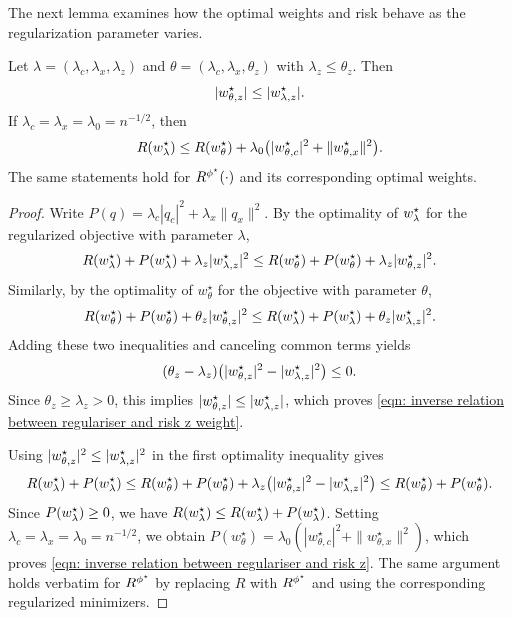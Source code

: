 The next lemma examines how the optimal weights and risk behave as the regularization parameter varies.

\begin{lem}\label{lem: inverse relation between regulariser and risk}
Let $\lambda=(\lambda_c,\lambda_x,\lambda_z)$ and
$\theta=(\lambda_c,\lambda_x,\theta_z)$ with
$\lambda_z\leq\theta_z$. Then
\begin{equation}\label{eqn: inverse relation between regulariser and risk z weight}
|w^\star_{\theta,z}|\leq|w^\star_{{\lambda,z}}|.
\end{equation}
If $\lambda_c=\lambda_x=\lambda_0=n^{-1/2}$, then
\begin{equation}\label{eqn: inverse relation between regulariser and risk z}
R(w^\star_{\lambda})\leq R(w^\star_\theta)
+\lambda_0\bigl(|w^\star_{\theta,c}|^2+\|w^\star_{\theta,x}\|^2\bigr).
\end{equation}
The same statements hold for $R^{\phi^\star}(\cdot)$ and its corresponding optimal weights.
\end{lem}

\begin{proof}
Write $P(q)=\lambda_c|q_c|^2+\lambda_x\|q_x\|^2$. By the optimality of $w^\star_{\lambda}$ for the regularized objective with parameter $\lambda$,
\[
R(w^\star_{\lambda})+P(w^\star_{\lambda})+\lambda_z|w^\star_{{\lambda,z}}|^2 \leq R(w^\star_\theta)+P(w^\star_\theta)+\lambda_z|w^\star_{\theta,z}|^2.
\]
Similarly, by the optimality of $w^\star_\theta$ for the objective with parameter $\theta$,
\[
R(w^\star_\theta)+P(w^\star_\theta)+\theta_z|w^\star_{\theta,z}|^2 \leq R(w^\star_{\lambda})+P(w^\star_{\lambda})+\theta_z|w^\star_{{\lambda,z}}|^2.
\]
Adding these two inequalities and canceling common terms yields
\begin{equation}\label{eqn: w theta less than w lambda}
(\theta_z-\lambda_z)\bigl(|w^\star_{\theta,z}|^2-|w^\star_{{\lambda,z}}|^2\bigr) \leq 0.
\end{equation}
Since $\theta_z \geq \lambda_z > 0$, this implies $|w^\star_{\theta,z}| \leq |w^\star_{{\lambda,z}}|$, which proves \eqref{eqn: inverse relation between regulariser and risk z weight}.

Using $|w^\star_{\theta,z}|^2 \leq |w^\star_{{\lambda,z}}|^2$ in the first optimality inequality gives
\[
R(w^\star_{\lambda})+P(w^\star_{\lambda}) \leq R(w^\star_\theta)+P(w^\star_\theta) + \lambda_z\big(|w^\star_{\theta,z}|^2 - |w^\star_{{\lambda,z}}|^2\big) \leq R(w^\star_\theta)+P(w^\star_\theta).
\]
Since $P(w^\star_{\lambda}) \geq 0$, we have $R(w^\star_{\lambda}) \leq R(w^\star_{\lambda}) + P(w^\star_{\lambda})$. Setting $\lambda_c = \lambda_x = \lambda_0 = n^{-1/2}$, we obtain $P(w^\star_\theta) = \lambda_0(|w^\star_{\theta,c}|^2 + \|w^\star_{\theta,x}\|^2)$, which proves \eqref{eqn: inverse relation between regulariser and risk z}. The same argument holds verbatim for $R^{\phi^\star}$ by replacing $R$ with $R^{\phi^\star}$ and using the corresponding regularized minimizers.
\end{proof}

